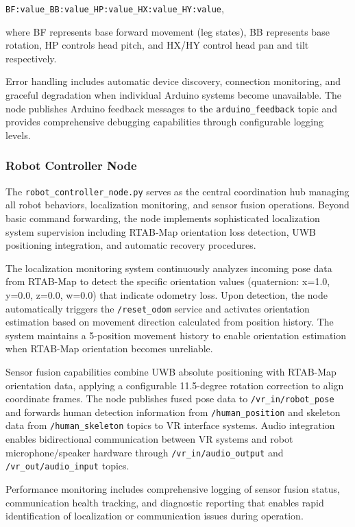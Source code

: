 \texttt{BF:value\_BB:value\_HP:value\_HX:value\_HY:value}, 

where BF represents base forward movement (leg states), BB represents base rotation, HP controls head pitch, and HX/HY control head pan and tilt respectively.

Error handling includes automatic device discovery, connection monitoring, and graceful degradation when individual Arduino systems become unavailable. The node publishes Arduino feedback messages to the \texttt{arduino\_feedback} topic and provides comprehensive debugging capabilities through configurable logging levels.

\subsubsection{Robot Controller Node}

The \texttt{robot\_controller\_node.py} serves as the central coordination hub managing all robot behaviors, localization monitoring, and sensor fusion operations. Beyond basic command forwarding, the node implements sophisticated localization system supervision including RTAB-Map orientation loss detection, UWB positioning integration, and automatic recovery procedures.

The localization monitoring system continuously analyzes incoming pose data from RTAB-Map to detect the specific orientation values (quaternion: x=1.0, y=0.0, z=0.0, w=0.0) that indicate odometry loss. Upon detection, the node automatically triggers the \texttt{/reset\_odom} service and activates orientation estimation based on movement direction calculated from position history. The system maintains a 5-position movement history to enable orientation estimation when RTAB-Map orientation becomes unreliable.

Sensor fusion capabilities combine UWB absolute positioning with RTAB-Map orientation data, applying a configurable 11.5-degree rotation correction to align coordinate frames. The node publishes fused pose data to \texttt{/vr\_in/robot\_pose} and forwards human detection information from \texttt{/human\_position} and skeleton data from \texttt{/human\_skeleton} topics to VR interface systems. Audio integration enables bidirectional communication between VR systems and robot microphone/speaker hardware through \texttt{/vr\_in/audio\_output} and \texttt{/vr\_out/audio\_input} topics.

Performance monitoring includes comprehensive logging of sensor fusion status, communication health tracking, and diagnostic reporting that enables rapid identification of localization or communication issues during operation.

